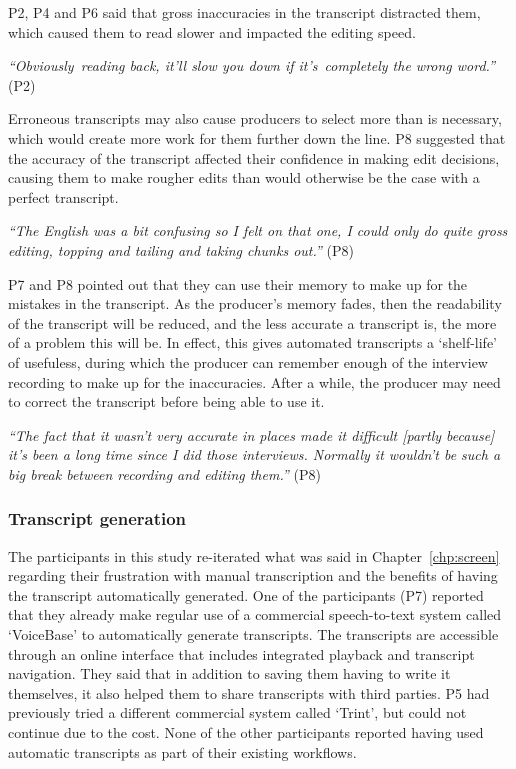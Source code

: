 P2, P4 and P6 said that gross inaccuracies in the transcript distracted them, which caused them to read slower and
impacted the editing speed.

\textit{``Obviously reading back, it'll slow you down if it's completely the wrong word.''} (P2)

Erroneous transcripts may also cause producers to select more than is necessary, which would create more work for them
further down the line. P8 suggested that the accuracy of the transcript affected their confidence in making edit
decisions, causing them to make rougher edits than would otherwise be the case with a perfect transcript.

\textit{``The English was a bit confusing so I felt on that one, I could only do quite gross editing, topping and
tailing and taking chunks out.''} (P8)

P7 and P8 pointed out that they can use their memory to make up for the mistakes in the transcript.  As the producer's
memory fades, then the readability of the transcript will be reduced, and the less accurate a transcript is, the more
of a problem this will be.  In effect, this gives automated transcripts a `shelf-life' of usefuless, during which the
producer can remember enough of the interview recording to make up for the inaccuracies. After a while, the producer
may need to correct the transcript before being able to use it.

\textit{``The fact that it wasn't very accurate in places made it difficult [partly because] it's been a long time
since I did those interviews. Normally it wouldn't be such a big break between recording and editing them.''} (P8)

\subsubsection{Transcript generation}

The participants in this study re-iterated what was said in Chapter~\ref{chp:screen} regarding their frustration with
manual transcription and the benefits of having the transcript automatically generated.  One of the participants (P7)
reported that they already make regular use of a commercial speech-to-text system called `VoiceBase' to automatically
generate transcripts. The transcripts are accessible through an online interface that includes integrated playback and
transcript navigation. They said that in addition to saving them having to write it themselves, it also helped them to
share transcripts with third parties. P5 had previously tried a different commercial system called `Trint', but could
not continue due to the cost. None of the other participants reported having used automatic transcripts as part of
their existing workflows.

